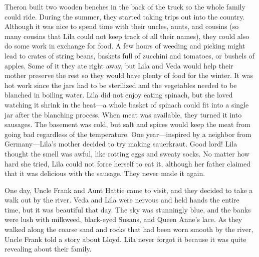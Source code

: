 \documentclass[
  american,
  letterpaper,
]{book}
\begin{document}
Theron built two wooden benches in the back of the truck so the whole
family could ride. During the summer, they started taking trips out into
the country. Although it was nice to spend time with their uncles,
aunts, and cousins (so many cousins that Lila could not keep track of
all their names), they could also do some work in exchange for food. A
few hours of weeding and picking might lead to crates of string beans,
baskets full of zucchini and tomatoes, or bushels of apples. Some of it
they ate right away, but Lila and Veda would help their mother preserve
the rest so they would have plenty of food for the winter. It was hot
work since the jars had to be sterilized and the vegetables needed to be
blanched in boiling water. Lila did not enjoy eating spinach, but she
loved watching it shrink in the heat---a whole basket of spinach could
fit into a single jar after the blanching process. When meat was
available, they turned it into sausages. The basement was cold, but salt
and spices would keep the meat from going bad regardless of the
temperature. One year---inspired by a neighbor from Germany---Lila's
mother decided to try making sauerkraut. Good lord! Lila thought the
smell was awful, like rotting eggs and sweaty socks. No matter how hard
she tried, Lila could not force herself to eat it, although her father
claimed that it was delicious with the sausage. They never made it
again.

One day, Uncle Frank and Aunt Hattie came to visit, and they decided to
take a walk out by the river. Veda and Lila were nervous and held hands
the entire time, but it was beautiful that day. The sky was stunningly
blue, and the banks were lush with milkweed, black-eyed Susans, and
Queen Anne's lace. As they walked along the coarse sand and rocks that
had been worn smooth by the river, Uncle Frank told a story about Lloyd.
Lila never forgot it because it was quite revealing about their family.
\end{document}
